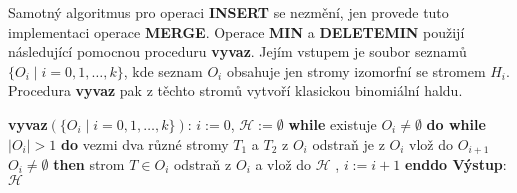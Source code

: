 \documentclass[a4paper,12pt]{article}
\begin{document}
Samotný algoritmus pro operaci {\bf INSERT} se nezmění, jen 
provede tuto implementaci ope\-race {\bf MER\-GE}.  Ope\-race 
{\bf MIN} a {\bf DELETE\-MIN} použijí následující pomocnou 
proceduru {\bf vyvaz}.  Jejím vstu\-pem je soubor 
seznamů $\{O_i\mid i=0,1,\dots,k\}$, kde seznam $O_i$ 
obsahuje jen stromy izomorfní se stromem $H_i$.  
Procedura {\bf vyvaz} pak z těchto stromů vytvoří 
klasickou binomiální hal\-du. 

{\bf vyvaz$(\{O_i\mid i=0,1,\dots,k\})$}:\newline 
$i:=0$, $\mathcal H:=\emptyset$\newline 
{\bf while} existuje $O_i\ne\emptyset$ {\bf do\newline 
\phantom{{\rm ---}}while} $|O_i|>1$ {\bf do\newline 
\phantom{{\rm ------}}}vezmi dva různé stromy $T_1$ a $
T_2$ z 
$O_i$\newline 
\phantom{------}odstraň je z $O_i$\newline 
\phantom{------}{\bf spoj$(T_1,T_2)$} vlož do $O_{i+1}$\newline 
{} $O_i\ne\emptyset$ {\bf then\newline 
\phantom{{\rm ------}}}strom $T\in O_i$ odstraň z $O_i$ a vlož do $
\mathcal H$\newline 
\phantom{---}{\bf endif},\newline 
\phantom{---}$i:=i+1$\newline 
{\bf enddo\newline 
Výstup}: $\mathcal H$
\end{document}
